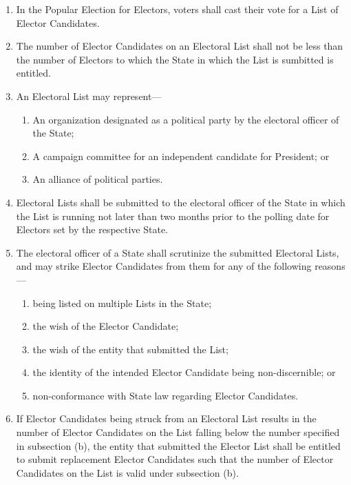 \documentclass{article}
\begin{document}
    \begin{enumerate}
        \item In the Popular Election for Electors, voters shall cast their vote for a List of Elector Candidates.
        \item The number of Elector Candidates on an Electoral List shall not be less than the number of Electors to which the State in which the List is sumbitted is entitled.
        \item An Electoral List may represent---
        \begin{enumerate}
            \item An organization designated as a political party by the electoral officer of the State;
            \item A campaign committee for an independent candidate for President; or
            \item An alliance of political parties.
        \end{enumerate}
        \item Electoral Lists shall be submitted to the electoral officer of the State in which the List is running not later than two months prior to the polling date for Electors set by the respective State.
        \item The electoral officer of a State shall scrutinize the submitted Electoral Lists, and may strike Elector Candidates from them for any of the following reasons---
        \begin{enumerate}
            \item being listed on multiple Lists in the State;
            \item the wish of the Elector Candidate;
            \item the wish of the entity that submitted the List;
            \item the identity of the intended Elector Candidate being non-discernible; or
            \item non-conformance with State law regarding Elector Candidates.
        \end{enumerate}
        \item If Elector Candidates being struck from an Electoral List results in the number of Elector Candidates on the List falling below the number specified in subsection (b), the entity that submitted the Elector List shall be entitled to submit replacement Elector Candidates such that the number of Elector Candidates on the List is valid under subsection (b).

\end{enumerate}
\end{document}
